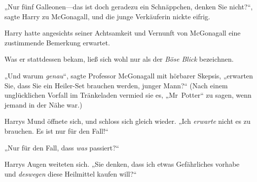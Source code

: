 „Nur fünf Galleonen—das ist doch geradezu ein Schnäppchen, denken Sie nicht?“, sagte Harry zu McGonagall, und die junge Verkäuferin nickte eifrig.

Harry hatte angesichts seiner Achtsamkeit und Vernunft von McGonagall eine zustimmende Bemerkung erwartet.

Was er stattdessen bekam, ließ sich wohl nur als der \emph{Böse Blick} bezeichnen.

„Und warum \emph{genau}“, sagte Professor McGonagall mit hörbarer Skepsis, „erwarten Sie, dass Sie ein Heiler-Set brauchen werden, junger Mann?“ (Nach einem unglücklichen Vorfall im Tränkeladen vermied sie es, „Mr~Potter“ zu sagen, wenn jemand in der Nähe war.)

Harrys Mund öffnete sich, und schloss sich gleich wieder. „Ich \emph{erwarte} nicht es zu brauchen. Es ist nur für den Fall!“

„Nur für den Fall, dass \emph{was} passiert?“

Harrys Augen weiteten sich. „Sie denken, dass ich etwas Gefährliches vorhabe und \emph{deswegen} diese Heilmittel kaufen will?“

